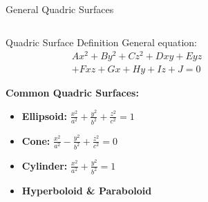 
\begin{frame}{General Quadric Surfaces}
    \begin{columns}
        \begin{column}{0.6\textwidth}
            \begin{mathbox}{Quadric Surface Definition}
                General equation:
                \begin{align*}
                    Ax^2 + By^2 + Cz^2 + Dxy + Eyz \\ + Fxz
                    + Gx + Hy + Iz + J = 0
                \end{align*}
                
                \textbf{Common Quadric Surfaces:}
                \begin{itemize}
                    \item \textbf{Ellipsoid:} $\frac{x^2}{a^2} + \frac{y^2}{b^2} + \frac{z^2}{c^2} = 1$
                    \item \textbf{Cone:} $\frac{x^2}{a^2} - \frac{y^2}{b^2} + \frac{z^2}{c^2} = 0$
                    \item \textbf{Cylinder:} $\frac{x^2}{a^2} + \frac{y^2}{b^2} = 1$
                    \item \textbf{Hyperboloid \& Paraboloid}
                \end{itemize}
            \end{mathbox}
        \end{column}
        \begin{column}{0.4\textwidth}
\end{column}
\end{columns}
\end{frame}
